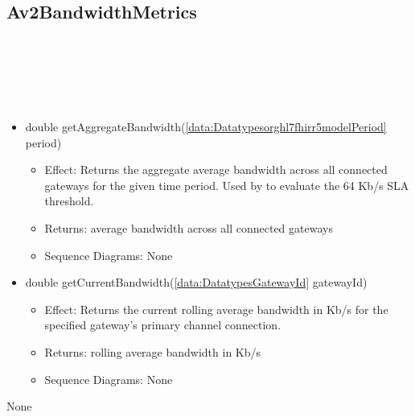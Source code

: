   \subsection{Av2BandwidthMetrics}\label{int:InterfacesAv2BandwidthMetrics}
    \begin{description}
      \item[Provided by:] \iconcomponent{}~
      \item[Required by:] \iconcomponent{}~ 
      \item[Operations:] ~
    \begin{itemize}[noitemsep,nolistsep,leftmargin=-.25cm]
      \item \textsf{double getAggregateBandwidth(\ref{data:Datatypesorghl7fhirr5modelPeriod} period)}
        \begin{itemize}[noitemsep,nolistsep]
           \item Effect: Returns the aggregate average bandwidth across all connected gateways for the given time period. Used by  to evaluate the 64 Kb/s SLA threshold. 
           \item Returns: average bandwidth across all connected gateways
           \item Sequence Diagrams: None
        \end{itemize}
      \item \textsf{double getCurrentBandwidth(\ref{data:DatatypesGatewayId} gatewayId)}
        \begin{itemize}[noitemsep,nolistsep]
           \item Effect: Returns the current rolling average bandwidth in Kb/s for the specified gateway's primary channel connection. 
           \item Returns: rolling average bandwidth in Kb/s
           \item Sequence Diagrams: None
        \end{itemize}
    \end{itemize}
      \item[Diagrams:] None
    \end{description}

